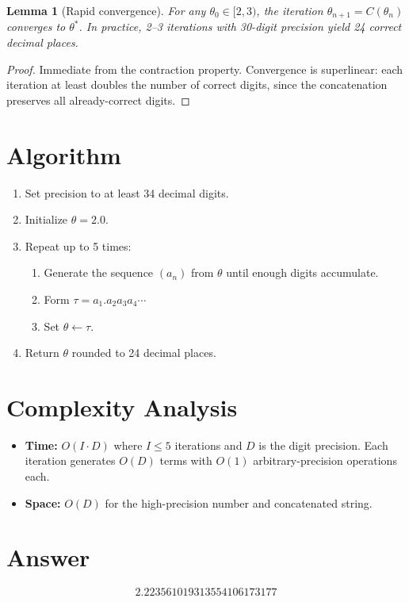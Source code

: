 \documentclass[12pt]{article}
\newtheorem{lemma}[theorem]{Lemma}
\begin{document}
\begin{lemma}[Rapid convergence]
For any $\theta_0 \in [2,3)$, the iteration $\theta_{n+1} = C(\theta_n)$ converges to $\theta^*$. In practice, 2--3 iterations with 30-digit precision yield 24 correct decimal places.
\end{lemma}

\begin{proof}
Immediate from the contraction property. Convergence is superlinear: each iteration at least doubles the number of correct digits, since the concatenation preserves all already-correct digits.
\end{proof}

\section{Algorithm}

\begin{enumerate}
\item Set precision to at least 34 decimal digits.
\item Initialize $\theta = 2.0$.
\item Repeat up to 5 times:
  \begin{enumerate}
  \item Generate the sequence $(a_n)$ from $\theta$ until enough digits accumulate.
  \item Form $\tau = a_1.a_2 a_3 a_4 \cdots$
  \item Set $\theta \leftarrow \tau$.
  \end{enumerate}
\item Return $\theta$ rounded to 24 decimal places.
\end{enumerate}

\section{Complexity Analysis}

\begin{itemize}
\item \textbf{Time:} $O(I \cdot D)$ where $I \leq 5$ iterations and $D$ is the digit precision. Each iteration generates $O(D)$ terms with $O(1)$ arbitrary-precision operations each.
\item \textbf{Space:} $O(D)$ for the high-precision number and concatenated string.
\end{itemize}

\section{Answer}

\[
\boxed{2.223561019313554106173177}
\]
\end{document}

